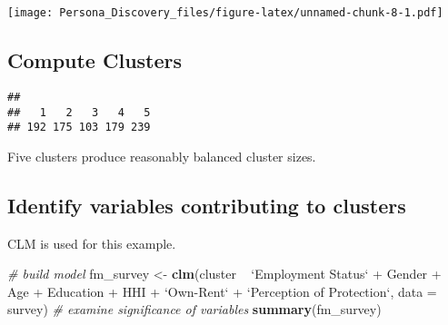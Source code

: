 \documentclass[]{article}
\newenvironment{Shaded}{\begin{snugshade}}{\end{snugshade}}
\newcommand{\KeywordTok}[1]{\textcolor[rgb]{0.13,0.29,0.53}{\textbf{{#1}}}}
\newcommand{\DataTypeTok}[1]{\textcolor[rgb]{0.13,0.29,0.53}{{#1}}}
\newcommand{\DecValTok}[1]{\textcolor[rgb]{0.00,0.00,0.81}{{#1}}}
\newcommand{\StringTok}[1]{\textcolor[rgb]{0.31,0.60,0.02}{{#1}}}
\newcommand{\CommentTok}[1]{\textcolor[rgb]{0.56,0.35,0.01}{\textit{{#1}}}}
\newcommand{\NormalTok}[1]{{#1}}
\begin{document}
\texttt{[image: Persona\_Discovery\_files/figure-latex/unnamed-chunk-8-1.pdf]}

\subsection{Compute Clusters}\label{compute-clusters}

\begin{Shaded}
\end{Shaded}

\begin{verbatim}
## 
##   1   2   3   4   5 
## 192 175 103 179 239
\end{verbatim}

\begin{Shaded}
\end{Shaded}

Five clusters produce reasonably balanced cluster sizes.

\subsection{Identify variables contributing to
clusters}\label{identify-variables-contributing-to-clusters}

CLM is used for this example.

\begin{Shaded}
\begin{Highlighting}[]
\CommentTok{# build model}
\NormalTok{fm_survey <-}\StringTok{ }\KeywordTok{clm}\NormalTok{(cluster ~}\StringTok{ `}\DataTypeTok{Employment Status}\StringTok{`} \NormalTok{+}\StringTok{ }\NormalTok{Gender +}\StringTok{ }\NormalTok{Age +}\StringTok{ }\NormalTok{Education +}\StringTok{ }\NormalTok{HHI +}\StringTok{ `}\DataTypeTok{Own-Rent}\StringTok{`} \NormalTok{+}\StringTok{ `}\DataTypeTok{Perception of Protection}\StringTok{`}\NormalTok{, }\DataTypeTok{data =} \NormalTok{survey)}
\CommentTok{# examine significance of variables}
\KeywordTok{summary}\NormalTok{(fm_survey)}
\end{Highlighting}
\end{Shaded}
\end{document}
